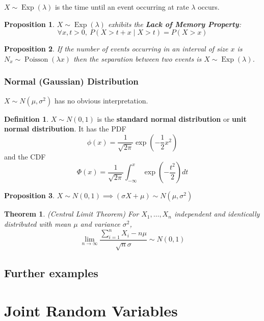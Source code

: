 \documentclass[12pt]{article}
\newtheorem{thm}{Theorem}[section]
\newtheorem*{prop*}{Proposition}
\theoremstyle{definition}
\newtheorem*{defn*}{Definition}
\DeclareMathOperator{\Poisson}{Poisson}
\DeclareMathOperator{\Exp}{Exp}
\begin{document}
$X \sim \Exp(\lambda)$ is the time until an event occurring at rate $\lambda$ occurs.

\begin{prop*}
  $X \sim \Exp(\lambda)$ exhibits the \textbf{Lack of Memory Property}:
  $$\forall x, t > 0,\ P(X > t + x \mid X > t) = P(X > x)$$
\end{prop*}

\begin{prop*}
  If the number of events occurring in an interval of size $x$ is\\ $N_x \sim \Poisson(\lambda x)$ then the separation between two events is $X \sim \Exp(\lambda)$.
\end{prop*}

\subsubsection{Normal (Gaussian) Distribution}

$X \sim N(\mu, \sigma^2)$ has no obvious interpretation.

\begin{defn*}
  $X \sim N(0, 1)$ is the \textbf{standard normal distribution} or \textbf{unit normal distribution}.
  It has the PDF
  $$\phi(x) = \frac{1}{\sqrt{2\pi}}\exp\left(-\frac{1}{2}x^2\right)$$
  and the CDF
  $$\Phi(x) = \frac{1}{\sqrt{2\pi}}\int_{-\infty}^x\exp\left(-\frac{t^2}{2}\right)dt$$
\end{defn*}

\begin{prop*}
  $X \sim N(0, 1) \implies (\sigma X + \mu) \sim N(\mu, \sigma^2)$
\end{prop*}


\begin{thm}
  (Central Limit Theorem)
  For $X_1, \ldots, X_n$ independent and identically distributed with mean $\mu$ and variance $\sigma^2$,
  $$\lim_{n \to \infty}\frac{\sum_{i = 1}^nX_i - n\mu}{\sqrt{n}\sigma} \sim N(0, 1)$$
\end{thm}


\subsection{Further examples}

\section{Joint Random Variables}
\end{document}
